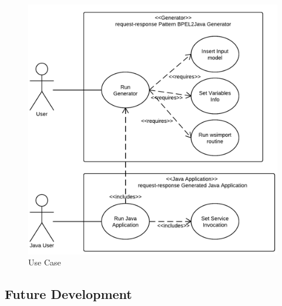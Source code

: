 \begin{figure}
  \begin{center}
    \includegraphics[scale=1.5]{pictures/GeneratorUseCase.png}
    \caption{Use Case}
    \label{fig:GeneratorUseCase}
  \end{center}
\end{figure}



\subsection{Future Development}
\label{sec:FutureDevelopment}

